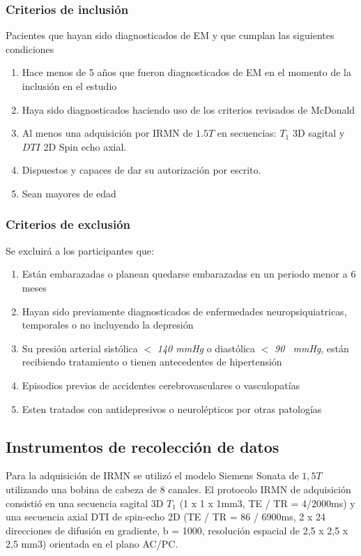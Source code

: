 \documentclass[fleqn,12pt]{UICArticle} %
\begin{document}
\subsubsection{Criterios de inclusión}
Pacientes que hayan sido diagnosticados de EM y que cumplan las siguientes condiciones
\begin{enumerate}[noitemsep]
\item Hace menos de 5 años que fueron diagnosticados de EM en el momento de la inclusión en el estudio
\item Haya sido diagnosticados haciendo uso de los criterios revisados de McDonald \cite{Polman20112}
\item Al menos una adquisición por IRMN de $1.5T$ en secuencias: $T_1$ 3D sagital y $DTI$ 2D Spin echo axial.
\item Dispuestos y capaces de dar su autorización por escrito.
\item Sean mayores de edad
\end{enumerate}

\subsubsection{Criterios de exclusión}
Se excluirá a los participantes que:
\begin{enumerate}[noitemsep]
\item Están embarazadas o planean quedarse embarazadas en un periodo menor a 6 meses
\item Hayan sido previamente diagnosticados de enfermedades neuropsiquiatricas, temporales o no incluyendo la depresión
\item Su presión arterial sistólica $<$ \textit{140 mmHg} o diastólica $<$ \textit{90 ~mmHg}, están recibiendo tratamiento o tienen antecedentes de hipertensión
\item Episodios previos de accidentes cerebrovasculares o vasculopatías
\item Esten tratados con antidepresivos o neurolépticos por otras patologías
\end{enumerate}


\subsection{Instrumentos de recolección de datos}
Para la adquisición de IRMN se utilizó el modelo Siemens Sonata de $1,5T$ utilizando una bobina de cabeza de $8$ canales. El protocolo IRMN de adquisición consistió en una secuencia sagital 3D $T_1$ (1 x 1 x 1mm3, TE / TR = 4/2000ms) y una secuencia axial DTI de spin-echo 2D (TE / TR = 86 / 6900ms, 2 x 24 direcciones de difusión en gradiente, b = 1000, resolución espacial de 2,5 x 2,5 x 2,5 mm3) orientada en el plano AC/PC.
\end{document}
